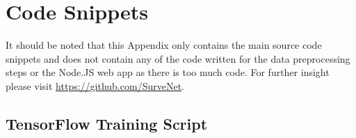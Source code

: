 \appendix


\section{ Code Snippets }
It should be noted that this Appendix only contains the main source code snippets and does not contain any of the code written for the data preprocessing steps or the Node.JS web app as there is too much code. For further insight please visit \href{https://github.com/SurveNet}{https://github.com/SurveNet}. 

\subsection{TensorFlow Training Script}
